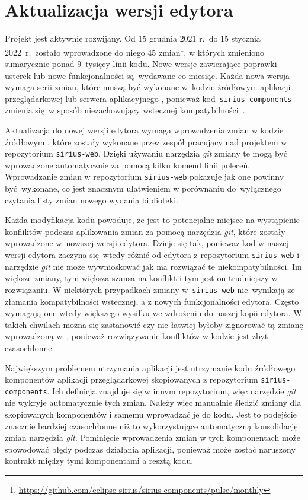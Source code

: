 \section{Aktualizacja wersji edytora}

Projekt \SiriusWeb{} jest aktywnie rozwijany. Od 15 grudnia 2021 r.\ do 15
stycznia 2022~r.\ zostało wprowadzone do niego 45 zmian\footnote{
	\url{https://github.com/eclipse-sirius/sirius-components/pulse/monthly}
}, w których zmieniono sumarycznie ponad 9~tysięcy linii kodu.
Nowe wersje zawierające poprawki usterek lub nowe funkcjonalności są~wydawane
co miesiąc. Każda nowa wersja wymaga serii zmian, które muszą być wykonane
w~kodzie źródłowym aplikacji przeglądarkowej lub serwera aplikacyjnego
\SiriusWeb{}, ponieważ kod~\texttt{sirius-components} zmienia się w sposób
niezachowujący wstecznej kompatybilności~\cite{sirius-components-changelog}.

Aktualizacja do nowej wersji edytora wymaga wprowadzenia zmian w kodzie
źródłowym \SiriusWeb{}, które zostały wykonane przez zespół pracujący nad
projektem w repozytorium \texttt{sirius-web}. Dzięki używaniu narzędzia
\emph{git} zmiany te mogą być wprowadzone automatycznie za pomocą kilku komend
linii poleceń. Wprowadzanie zmian w repozytorium \texttt{sirius-web} pokazuje
jak one powinny być wykonane, co jest znacznym ułatwieniem w porównaniu
do~wyłącznego czytania listy zmian nowego wydania biblioteki.

Każda modyfikacja kodu \SiriusWeb{} powoduje, że jest to potencjalne
miejsce na wystąpienie konfliktów podczas aplikowania zmian za pomocą narzędzia
\emph{git}, które zostały wprowadzone w~nowszej wersji edytora.
Dzieje się tak, ponieważ kod w naszej wersji edytora zaczyna się wtedy różnić
od edytora z repozytorium \texttt{sirius-web} i narzędzie \emph{git} nie może
wywnioskować jak ma rozwiązać te niekompatybilności.
Im większe zmiany, tym większa szansa na konflikt i tym jest on trudniejszy w
rozwiązaniu.
W niektórych przypadkach zmiany w~\texttt{sirius-web} nie~wynikają ze złamania
kompatybilności wstecznej, a z nowych funkcjonalności edytora. Często
wymagają one wtedy większego wysiłku we wdrożeniu do naszej kopii edytora.
W takich chwilach można się zastanowić czy nie łatwiej byłoby zignorować tą
zmianę wprowadzoną w~\SiriusWeb{}, ponieważ rozwiązywanie konfliktów w
kodzie jest zbyt czasochłonne.

Największym problemem utrzymania aplikacji \SiriusWeb{} jest utrzymanie
kodu źródłowego komponentów aplikacji przeglądarkowej skopiowanych z
repozytorium \texttt{sirius-components}. Ich definicja znajduje się w innym
repozytorium, więc narzędzie \emph{git} nie wykryje automatycznie tych zmian.
Należy więc manualnie śledzić zmiany dla skopiowanych komponentów i samemu
wprowadzać je do kodu. Jest to podejście znacznie bardziej czasochłonne
niż to wykorzystujące automatyczną konsolidację zmian narzędzia \emph{git}.
Pominięcie wprowadzenia zmian w tych komponentach może spowodować błędy podczas
działania aplikacji, ponieważ może zostać naruszony kontrakt między tymi
komponentami a resztą kodu.

